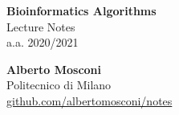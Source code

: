 \documentclass[12pt, letterpaper]{article}
\begin{document}
\begin{titlepage}
    \vspace*{2cm}
    \begin{center}
        \huge{\bfseries Bioinformatics Algorithms} \\[10pt]
        \Large{Lecture Notes} \\[10pt]
        \large{a.a. 2020/2021} \\
    \end{center}
    \vfill
    \begin{flushleft}
        \large
        \textbf{Alberto Mosconi} \\
        \normalsize
        Politecnico di Milano \\
        \href{https://github.com/albertomosconi/notes.git}{github.com/albertomosconi/notes}
    \end{flushleft}
\end{titlepage}

\thispagestyle{empty}
\tableofcontents
\newpage

\setcounter{page}{1}





\end{document}
